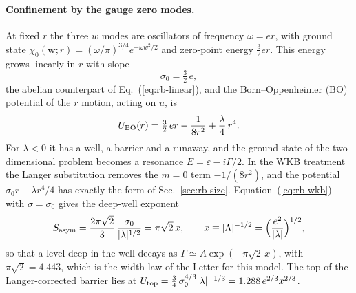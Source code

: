 \paragraph{Confinement by the gauge zero modes.}
At fixed $r$ the three $w$ modes are oscillators of frequency $\omega=er$, with ground state $\chi_0(\bm w;r)=(\omega/\pi)^{3/4}e^{-\omega w^2/2}$ and zero-point energy $\frac32er$.
This energy grows linearly in $r$ with slope
\begin{equation}
\sigma_0=\tfrac32\,e,
\label{eq:v11-ab-sigma0}
\end{equation}
the abelian counterpart of Eq.~(\ref{eq:rb-linear}), and the Born--Oppenheimer (BO) potential of the $r$ motion, acting on $u$, is
\begin{equation}
U_{\rm BO}(r)=\tfrac32\,er-\frac{1}{8r^2}+\frac\lambda4\,r^4 .
\label{eq:v11-ab-UBO}
\end{equation}
For $\lambda<0$ it has a well, a barrier and a runaway, and the ground state of the two-dimensional problem becomes a resonance $E=\varepsilon-i\Gamma/2$.
In the WKB treatment the Langer substitution removes the $m=0$ term $-1/(8r^2)$, and the potential $\sigma_0r+\lambda r^4/4$ has exactly the form of Sec.~\ref{sec:rb-size}.
Equation~(\ref{eq:rb-wkb}) with $\sigma=\sigma_0$ gives the deep-well exponent
\begin{equation}
S_{\rm asym}=\frac{2\pi\sqrt2}{3}\,\frac{\sigma_0}{|\lambda|^{1/2}}=\pi\sqrt2\,x,\qquad x\equiv|\Lambda|^{-1/2}=\Bigl(\frac{e^2}{|\lambda|}\Bigr)^{1/2},
\label{eq:v11-ab-Sasym}
\end{equation}
so that a level deep in the well decays as $\Gamma\simeq A\exp(-\pi\sqrt2\,x)$, with $\pi\sqrt2=4.443$, which is the width law of the Letter for this model. %
The top of the Langer-corrected barrier lies at $U_{\rm top}=\frac34\,\sigma_0^{4/3}|\lambda|^{-1/3}=1.288\,e^{2/3}x^{2/3}$. %

